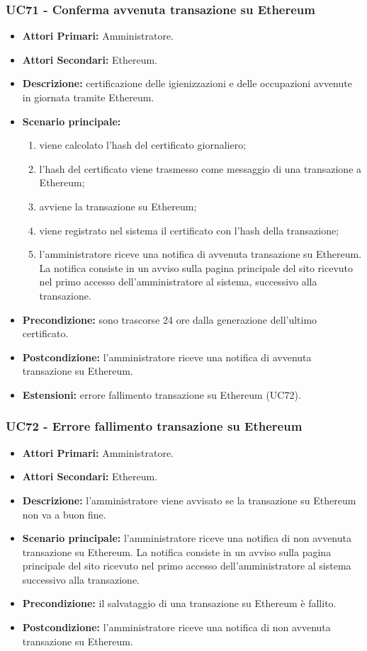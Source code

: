 \subsubsection{UC71 - Conferma avvenuta transazione su Ethereum}
\begin{itemize}
	\item\textbf{Attori Primari:} Amministratore.
	\item\textbf{Attori Secondari:} Ethereum.
	\item\textbf{Descrizione:} certificazione delle igienizzazioni e delle occupazioni avvenute in giornata tramite Ethereum.
	\item\textbf{Scenario principale:}
	\begin{enumerate}
		\item viene calcolato l'hash del certificato giornaliero;
		\item l'hash del certificato viene trasmesso come messaggio di una transazione a Ethereum;
		\item avviene la transazione su Ethereum;
		\item viene registrato nel sistema il certificato con l'hash della transazione;
		\item l'amministratore riceve una notifica di avvenuta transazione su Ethereum. La notifica consiste in un avviso sulla pagina principale del sito ricevuto nel primo accesso dell'amministratore al sistema, successivo alla transazione.
	\end{enumerate}
	\item\textbf{Precondizione:} sono trascorse 24 ore dalla generazione dell'ultimo certificato.   
	\item\textbf{Postcondizione:} l'amministratore riceve una notifica di avvenuta transazione su Ethereum.
	\item\textbf{Estensioni:} errore fallimento transazione su Ethereum (UC72).
\end{itemize}

\subsubsection{ UC72 - Errore fallimento transazione su Ethereum }
\begin{itemize}
	\item\textbf{Attori Primari:} Amministratore.
	\item\textbf{Attori Secondari:} Ethereum.
	\item\textbf{Descrizione:} l'amministratore viene avvisato se la transazione su Ethereum non va a buon fine.
	\item\textbf{Scenario principale:} l'amministratore riceve una notifica di non avvenuta transazione su Ethereum. La notifica consiste in un avviso sulla pagina principale del sito ricevuto nel primo accesso dell'amministratore al sistema successivo alla transazione.
	\item\textbf{Precondizione:} il salvataggio di una transazione su Ethereum è fallito.
	\item\textbf{Postcondizione:} l'amministratore riceve una notifica di non avvenuta transazione su Ethereum.
\end{itemize}
